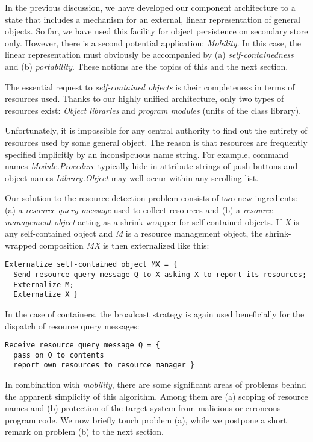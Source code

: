 In the previous discussion, we have developed our component architecture to a
state that includes a mechanism for an external, linear representation of
general  objects. So far, we have used this facility for object persistence on
secondary store only. However, there is a second potential application:
{\em Mobility}. In this case, the linear representation must obviously be
accompanied by (a) {\em self-containedness\/} and (b) {\em portability}.
These notions are the topics of this and the next section.

\ein
The essential request to {\em self-contained objects\/} is their completeness
in terms of resources used. Thanks to our highly unified architecture, only
two
types of resources exist: {\em Object libraries} and {\em program modules\/}
(units of the class library).

\ein
Unfortunately, it is impossible for any central authority to find out the
entirety
of resources used by some general object. The reason is that resources are
frequently specified implicitly by an inconsipcuous name string. For example,
command names {\em Module.Procedure\/} typically hide in attribute strings
of push-buttons and object names {\em Library.Object\/} may well occur
within any scrolling list.

\ein
Our solution to the resource detection problem consists of two new
ingredients:
(a) a {\em resource query message\/} used to collect resources and
(b) a {\em resource management object\/} acting as a shrink-wrapper for
self-contained objects.
If {\em X\/} is any self-contained object and {\em M\/} is a resource
management object, the shrink-wrapped composition {\em MX\/} is then
externalized like this:

{\small\begin{verbatim}
Externalize self-contained object MX = {
  Send resource query message Q to X asking X to report its resources;
  Externalize M;
  Externalize X }
\end{verbatim}}
 
In the case of containers, the broadcast strategy is again used beneficially
for the dispatch of resource query messages:

{\small\begin{verbatim}
Receive resource query message Q = {
  pass on Q to contents
  report own resources to resource manager }
\end{verbatim}}

In combination with {\em mobility\/}, there are some significant areas of
problems behind the apparent simplicity of this algorithm. Among them are
(a) scoping of resource names and (b) protection of the target system from
malicious or erroneous program code. We now briefly touch problem (a),
while we postpone a short remark on problem (b) to the next section.

